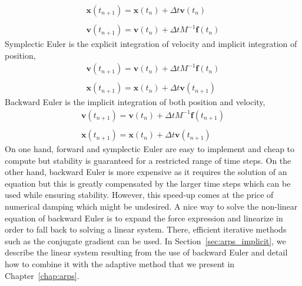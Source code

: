 \begin{equation}
\label{eq:explicitEuler}
\begin{array}{l}
\displaystyle \mathbf{x}(t_{n+1}) = \mathbf{x}(t_{n}) + \Delta t \mathbf{v}(t_{n}) \\ \\
\displaystyle \mathbf{v}(t_{n+1}) = \mathbf{v}(t_{n}) + \Delta t M^{-1}\mathbf{f}(t_{n})
\end{array}
\end{equation}
Symplectic Euler is the explicit integration of velocity and implicit integration of position,
\begin{equation}
\label{eq:symplecticEuler}
\begin{array}{l}
\displaystyle \mathbf{v}(t_{n+1}) = \mathbf{v}(t_{n}) + \Delta t M^{-1} \mathbf{f}(t_{n}) \\ \\
\displaystyle \mathbf{x}(t_{n+1}) = \mathbf{x}(t_{n}) + \Delta t \mathbf{v}(t_{n+1})
\end{array}
\end{equation}
Backward Euler is the implicit integration of both position and velocity,
\begin{equation}
\label{eq:backwardEuler}
\begin{array}{ll}
\displaystyle \mathbf{v}(t_{n+1}) = \mathbf{v}(t_{n}) + \Delta t M^{-1} \mathbf{f}(t_{n+1}) \\ \\
\displaystyle \mathbf{x}(t_{n+1}) = \mathbf{x}(t_{n}) + \Delta t \mathbf{v}(t_{n+1})
\end{array}
\end{equation}
On one hand, forward and symplectic Euler are easy to implement and cheap to compute but stability is guaranteed for a restricted range of time steps. 
On the other hand, backward Euler is more expensive as it requires the solution of an equation but this is greatly compensated by the larger time steps which can be used while ensuring stability.
However, this speed-up comes at the price of numerical damping which might be undesired.
A nice way to solve the non-linear equation of backward Euler is to expand the force expression and linearize in order to fall back to solving a linear system. There, efficient iterative methods such as the conjugate gradient can be used.
In Section~\ref{sec:arps_implicit}, we describe the linear system resulting from the use of backward Euler and detail how to combine it with the adaptive method that we present in Chapter~\ref{chap:arps}.

